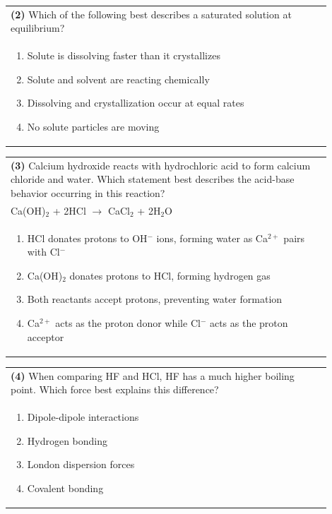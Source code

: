 \documentclass{article}
\begin{document}
\noindent\begin{tabular}{|p{0.9\linewidth}|}
\hline
\textbf{(2)} Which of the following best describes a saturated solution at equilibrium?\\[0.2cm]
\begin{minipage}[t]{0.85\linewidth}
\begin{enumerate}[label=\alph*.]
\item Solute is dissolving faster than it crystallizes
\item Solute and solvent are reacting chemically
\item Dissolving and crystallization occur at equal rates
\item No solute particles are moving
\end{enumerate}
\end{minipage}\\[0.2cm]
\hline
\end{tabular}

\noindent\begin{tabular}{|p{0.9\linewidth}|}
\hline
\textbf{(3)} Calcium hydroxide reacts with hydrochloric acid to form calcium chloride and water. Which statement best describes the acid-base behavior occurring in this reaction?\\[0.2cm]
Ca(OH)$_2$ + 2HCl $\rightarrow$ CaCl$_2$ + 2H$_2$O\\[0.2cm]
\begin{minipage}[t]{0.85\linewidth}
\begin{enumerate}[label=\alph*.]
\item HCl donates protons to OH$^-$ ions, forming water as Ca$^{2+}$ pairs with Cl$^-$
\item Ca(OH)$_2$ donates protons to HCl, forming hydrogen gas
\item Both reactants accept protons, preventing water formation
\item Ca$^{2+}$ acts as the proton donor while Cl$^-$ acts as the proton acceptor
\end{enumerate}
\end{minipage}\\[0.2cm]
\hline
\end{tabular}

\noindent\begin{tabular}{|p{0.9\linewidth}|}
\hline
\textbf{(4)} When comparing HF and HCl, HF has a much higher boiling point. Which force best explains this difference?\\[0.2cm]
\begin{minipage}[t]{0.85\linewidth}
\begin{enumerate}[label=\alph*.]
\item Dipole-dipole interactions
\item Hydrogen bonding
\item London dispersion forces
\item Covalent bonding
\end{enumerate}
\end{minipage}\\[0.2cm]
\hline
\end{tabular}
\end{document}
